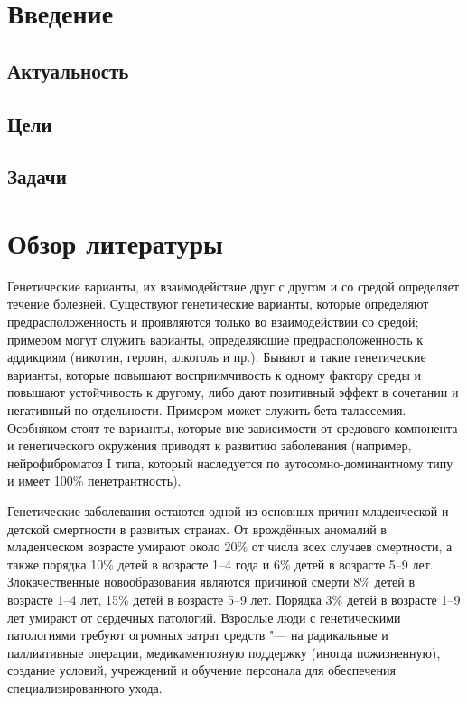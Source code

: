 \documentclass[a4paper,12pt]{article}
\begin{document}
\section{Введение}

\subsection{Актуальность}

\subsection{Цели}

\subsection{Задачи}

\section{Обзор литературы}

Генетические варианты, их взаимодействие друг с другом и со средой определяет течение болезней.
Существуют генетические варианты, которые определяют предрасположенность и проявляются только во взаимодействии со средой; примером могут служить варианты, определяющие предрасположенность к аддикциям (никотин, героин, алкоголь и пр.)\cite{Hiroi_2004}.
Бывают и такие генетические варианты, которые повышают восприимчивость к одному фактору среды и повышают устойчивость к другому, либо дают позитивный эффект в сочетании и негативный по отдельности.
Примером может служить бета-талассемия\cite{Galanello_2010}.
Особняком стоят те варианты, которые вне зависимости от средового компонента и генетического окружения приводят к развитию заболевания (например, нейрофиброматоз I типа, который наследуется по аутосомно-доминантному типу и имеет 100\% пенетрантность\cite{Jett_2009}).

Генетические заболевания остаются одной из основных причин младенческой и детской смертности в развитых странах.
От врождённых аномалий в младенческом возрасте умирают около 20\% от числа всех случаев смертности, а также порядка 10\% детей в возрасте 1--4 года и 6\% детей в возрасте 5--9 лет.
Злокачественные новообразования являются причиной смерти 8\% детей в возрасте 1--4 лет, 15\% детей в возрасте 5--9 лет.
Порядка 3\% детей в возрасте 1--9 лет умирают от сердечных патологий\cite{Field_2003}.
Взрослые люди с генетическими патологиями требуют огромных затрат средств "--- на радикальные и паллиативные операции, медикаментозную поддержку (иногда пожизненную), создание условий, учреждений и обучение персонала для обеспечения специализированного ухода.
\end{document}
